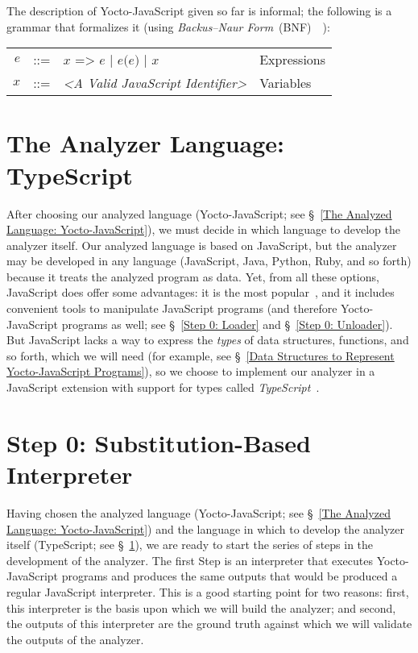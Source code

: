 \documentclass[12pt, oneside]{book}
\begin{document}
The description of Yocto-JavaScript given so far is informal; the following is a grammar that formalizes it (using \emph{Backus–Naur Form}~(BNF)~\cite{bnf}~\cite[§~4.2]{dragon-book}):

\begin{center}
\begin{tabular}{rcll}
$e$ & ::= & $x\texttt{ => }e$ | $e\texttt{(}e\texttt{)}$ | $x$ & Expressions \\
$x$ & ::= & \emph{<A Valid JavaScript Identifier>} & Variables \\
\end{tabular}
\end{center}

\section{The Analyzer Language: TypeScript}
\label{The Analyzer Language: TypeScript}

After choosing our analyzed language (Yocto-JavaScript; see §~\ref{The Analyzed Language: Yocto-JavaScript}), we must decide in which language to develop the analyzer itself. Our analyzed language is based on JavaScript, but the analyzer may be developed in any language (JavaScript, Java, Python, Ruby, and so forth) because it treats the analyzed program as data. Yet, from all these options, JavaScript does offer some advantages: it is the most popular~\cite{stack-overflow-developer-survey, jet-brains-developer-survey}, and it includes convenient tools to manipulate JavaScript programs (and therefore Yocto-JavaScript programs as well; see §~\ref{Step 0: Loader} and §~\ref{Step 0: Unloader}). But JavaScript lacks a way to express the \emph{types} of data structures, functions, and so forth, which we will need (for example, see §~\ref{Data Structures to Represent Yocto-JavaScript Programs}), so we choose to implement our analyzer in a JavaScript extension with support for types called \emph{TypeScript}~\cite{typescript, typescript-deep-dive, understanding-typescript}.

\section{Step 0: Substitution-Based Interpreter}
\label{Step 0: Substitution-Based Interpreter}

Having chosen the analyzed language (Yocto-JavaScript; see §~\ref{The Analyzed Language: Yocto-JavaScript}) and the language in which to develop the analyzer itself (TypeScript; see §~\ref{The Analyzer Language: TypeScript}), we are ready to start the series of steps in the development of the analyzer. The first Step is an interpreter that executes Yocto-JavaScript programs and produces the same outputs that would be produced a regular JavaScript interpreter. This is a good starting point for two reasons: first, this interpreter is the basis upon which we will build the analyzer; and second, the outputs of this interpreter are the ground truth against which we will validate the outputs of the analyzer.
\end{document}
